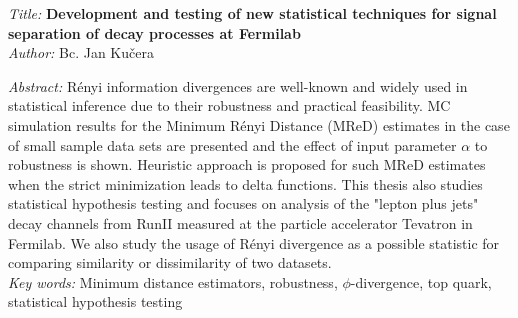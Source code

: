 {\vspace{1.4cm}

\textit{Title:}
\textbf{Development and testing of new statistical techniques for signal separation of decay processes at Fermilab} \\

\textit{Author:} Bc. Jan Ku\v{c}era\\
\begin{samepage}
\textit{Abstract:} 
R\'enyi information divergences are well-known and widely used in statistical inference due to their robustness and practical feasibility. MC simulation results for the Minimum
R\'enyi Distance (MReD) estimates in the case of small sample data sets are presented and the
effect of input parameter $\alpha$ to robustness is shown. Heuristic approach is proposed for such MReD estimates when the strict minimization leads to delta functions. This thesis also studies statistical hypothesis testing and focuses on analysis of the "lepton plus jets" decay channels from RunII measured at the particle accelerator Tevatron in Fermilab. We also study the usage of R\'enyi divergence as a possible statistic for comparing similarity or dissimilarity of two datasets.
 \\

{\textit{Key words:}  Minimum distance estimators, robustness, $\phi$-divergence, top quark, statistical hypothesis testing}

\end{samepage}}

